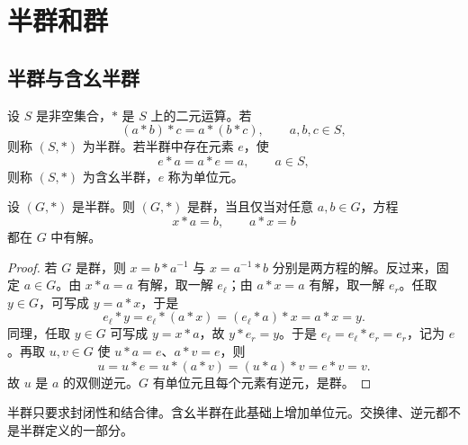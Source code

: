 %
%

\chapter{半群和群}

\section{半群与含幺半群}

\begin{definition}[半群与含幺半群]\label{semigroup-monoid}
  设 $S$ 是非空集合，$*$ 是 $S$ 上的二元运算。若
  \[
  (a*b)*c=a*(b*c),\qquad a,b,c\in S,
  \]
  则称 $(S,*)$ 为半群。若半群中存在元素 $e$，使
  \[
  e*a=a*e=a,\qquad a\in S,
  \]
  则称 $(S,*)$ 为含幺半群，$e$ 称为单位元。
\end{definition}

\begin{theorem}[群的解方程判定]\label{group-equation-test}
  设 $(G,*)$ 是半群。则 $(G,*)$ 是群，当且仅当对任意 $a,b\in G$，方程
  \[
  x*a=b,\qquad a*x=b
  \]
  都在 $G$ 中有解。
\end{theorem}

\begin{proof}
  若 $G$ 是群，则 $x=b*a^{-1}$ 与 $x=a^{-1}*b$ 分别是两方程的解。反过来，固定 $a\in G$。由 $x*a=a$ 有解，取一解 $e_\ell$；由 $a*x=a$ 有解，取一解 $e_r$。任取 $y\in G$，可写成 $y=a*x$，于是
  \[
  e_\ell*y=e_\ell*(a*x)=(e_\ell*a)*x=a*x=y.
  \]
  同理，任取 $y\in G$ 可写成 $y=x*a$，故 $y*e_r=y$。于是 $e_\ell=e_\ell*e_r=e_r$，记为 $e$。再取 $u,v\in G$ 使 $u*a=e$、$a*v=e$，则
  \[
  u=u*e=u*(a*v)=(u*a)*v=e*v=v.
  \]
  故 $u$ 是 $a$ 的双侧逆元。$G$ 有单位元且每个元素有逆元，是群。
\end{proof}

半群只要求封闭性和结合律。含幺半群在此基础上增加单位元。交换律、逆元都不是半群定义的一部分。

